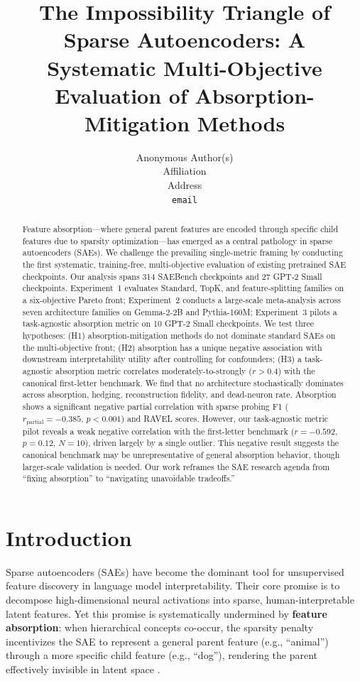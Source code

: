 \documentclass{article}
\title{The Impossibility Triangle of Sparse Autoencoders: A Systematic Multi-Objective Evaluation of Absorption-Mitigation Methods}
\author{%
  Anonymous Author(s) \\
  Affiliation \\
  Address \\
  \texttt{email} \\
}
\begin{document}
\maketitle

\begin{abstract}
Feature absorption---where general parent features are encoded through specific child features due to sparsity optimization---has emerged as a central pathology in sparse autoencoders (SAEs). We challenge the prevailing single-metric framing by conducting the first systematic, training-free, multi-objective evaluation of existing pretrained SAE checkpoints. Our analysis spans 314 SAEBench checkpoints and 27 GPT-2 Small checkpoints. Experiment~1 evaluates Standard, TopK, and feature-splitting families on a six-objective Pareto front; Experiment~2 conducts a large-scale meta-analysis across seven architecture families on Gemma-2-2B and Pythia-160M; Experiment~3 pilots a task-agnostic absorption metric on 10 GPT-2 Small checkpoints. We test three hypotheses: (H1) absorption-mitigation methods do not dominate standard SAEs on the multi-objective front; (H2) absorption has a unique negative association with downstream interpretability utility after controlling for confounders; (H3) a task-agnostic absorption metric correlates moderately-to-strongly ($r > 0.4$) with the canonical first-letter benchmark. We find that no architecture stochastically dominates across absorption, hedging, reconstruction fidelity, and dead-neuron rate. Absorption shows a significant negative partial correlation with sparse probing F1 ($r_{\text{partial}} = -0.385$, $p < 0.001$) and RAVEL scores. However, our task-agnostic metric pilot reveals a weak negative correlation with the first-letter benchmark ($r = -0.592$, $p = 0.12$, $N = 10$), driven largely by a single outlier. This negative result suggests the canonical benchmark may be unrepresentative of general absorption behavior, though larger-scale validation is needed. Our work reframes the SAE research agenda from ``fixing absorption'' to ``navigating unavoidable tradeoffs.''
\end{abstract}

\section{Introduction}
\label{sec:intro}

Sparse autoencoders (SAEs) have become the dominant tool for unsupervised feature discovery in language model interpretability. Their core promise is to decompose high-dimensional neural activations into sparse, human-interpretable latent features. Yet this promise is systematically undermined by \textbf{feature absorption}: when hierarchical concepts co-occur, the sparsity penalty incentivizes the SAE to represent a general parent feature (e.g., ``animal'') through a more specific child feature (e.g., ``dog''), rendering the parent effectively invisible in latent space \citep{chanin2024absorption}.
\end{document}

